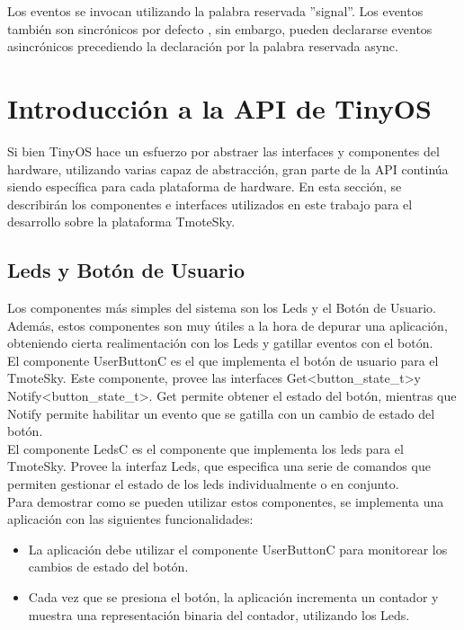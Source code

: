Los eventos se invocan utilizando la palabra reservada ''signal''. Los eventos también son sincrónicos  por defecto , sin embargo, pueden declararse eventos asincrónicos precediendo la declaración por la palabra reservada async. 

\section{Introducción a la API de TinyOS}
Si bien TinyOS hace un esfuerzo por abstraer las interfaces y componentes del hardware, utilizando varias capaz de abstracción, gran parte de la API continúa siendo específica para cada plataforma de hardware. En esta sección, se describirán los componentes e interfaces utilizados en este trabajo para el desarrollo sobre la plataforma TmoteSky.

\subsection{Leds y Botón de Usuario}
Los componentes más simples del sistema son los Leds y el Botón de Usuario. Además, estos componentes son muy útiles a la hora de depurar una aplicación, obteniendo cierta realimentación con los Leds y gatillar eventos con el botón.\\

El componente UserButtonC es el que implementa el botón de usuario para el TmoteSky. Este componente, provee las interfaces Get\textless button\_state\_t\textgreater y Notify\textless button\_state\_t\textgreater.  Get permite obtener el estado del botón, mientras que Notify permite habilitar un evento que se gatilla con un cambio de estado del botón.\\

El componente LedsC es el componente que implementa los leds para el TmoteSky. Provee la interfaz Leds, que especifica una serie de comandos que permiten gestionar el estado de los leds individualmente o en conjunto.\\

Para demostrar como se pueden utilizar estos componentes, se implementa una aplicación con las siguientes funcionalidades:

\begin{itemize}
\item La aplicación debe utilizar el componente UserButtonC para monitorear los cambios de estado del botón.
\item Cada vez que se presiona el botón, la aplicación incrementa un contador y muestra una representación binaria del contador, utilizando los Leds.
\end{itemize}

